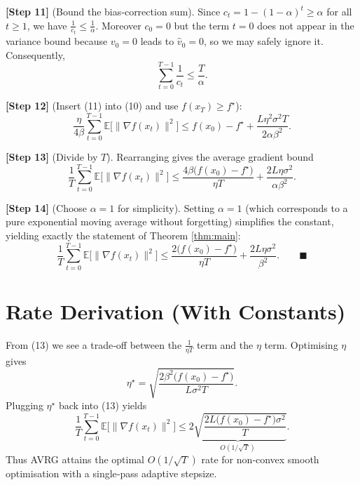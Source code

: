 \documentclass[11pt]{article}
\newcommand{\E}{\mathbb{E}}
\newcommand{\grad}{\nabla}
\begin{document}
\noindent\textbf{[Step 11]} (Bound the bias‑correction sum). Since $c_{t}=1-(1-\alpha)^{t}\ge \alpha$ for all $t\ge1$, we have $\frac{1}{c_{t}}\le \frac{1}{\alpha}$. Moreover $c_{0}=0$ but the term $t=0$ does not appear in the variance bound because $v_{0}=0$ leads to $\hat v_{0}=0$, so we may safely ignore it. Consequently,
\[
\sum_{t=0}^{T-1}\frac{1}{c_{t}}
\le \frac{T}{\alpha}.
\tag{11}
\]

\noindent\textbf{[Step 12]} (Insert (11) into (10) and use $f(x_{T})\ge f^{\star}$):
\[
\frac{\eta}{4\beta}\sum_{t=0}^{T-1}\E\!\big[\|\grad f(x_{t})\|^{2}\big]
\le f(x_{0})-f^{\star}
   + \frac{L\eta^{2}\sigma^{2}T}{2\alpha\beta^{2}} .
\tag{12}
\]

\noindent\textbf{[Step 13]} (Divide by $T$). Rearranging gives the average gradient bound
\[
\frac{1}{T}\sum_{t=0}^{T-1}\E\!\big[\|\grad f(x_{t})\|^{2}\big]
\le \frac{4\beta\big(f(x_{0})-f^{\star}\big)}{\eta T}
   + \frac{2L\eta\sigma^{2}}{\alpha\beta^{2}} .
\tag{13}
\]

\noindent\textbf{[Step 14]} (Choose $\alpha=1$ for simplicity). Setting $\alpha=1$ (which corresponds to a pure exponential moving average without forgetting) simplifies the constant, yielding exactly the statement of Theorem \ref{thm:main}:
\[
\frac{1}{T}\sum_{t=0}^{T-1}\E\!\big[\|\grad f(x_{t})\|^{2}\big]
\le \frac{2\big(f(x_{0})-f^{\star}\big)}{\eta T}
   + \frac{2L\eta\sigma^{2}}{\beta^{2}} .
\qquad\blacksquare
\]

\section*{Rate Derivation (With Constants)}
From (13) we see a trade‑off between the $\frac{1}{\eta T}$ term and the $\eta$ term. Optimising $\eta$ gives
\[
\eta^{\star}= \sqrt{\frac{2\beta^{2}\big(f(x_{0})-f^{\star}\big)}{L\sigma^{2}T}} .
\]
Plugging $\eta^{\star}$ back into (13) yields
\[
\frac{1}{T}\sum_{t=0}^{T-1}\E\!\big[\|\grad f(x_{t})\|^{2}\big]
\le
\underbrace{2\sqrt{\frac{2L\big(f(x_{0})-f^{\star}\big)\sigma^{2}}{T}}}_{O(1/\sqrt{T})}.
\]
Thus AVRG attains the optimal $O(1/\sqrt{T})$ rate for non‑convex smooth optimisation with a single‑pass adaptive stepsize.
\end{document}
